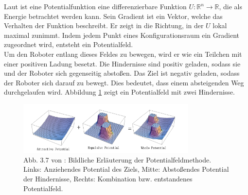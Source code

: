 Laut \cite{Principles:05} ist eine Potentialfunktion eine differenzierbare Funktion $U : \mathbb{R}^{n} \rightarrow \mathbb{R}$, die als Energie betrachtet werden kann. Sein Gradient ist ein Vektor, welche das Verhalten der Funktion beschreibt. Er zeigt in die Richtung, in der $U$ lokal maximal zunimmt. Indem jedem Punkt eines Konfigurationsraum ein Gradient zugeordnet wird, entsteht ein Potentialfeld.\\
Um den Roboter entlang dieses Feldes zu bewegen, wird er wie ein Teilchen mit einer positiven Ladung besetzt. Die Hindernisse sind positiv geladen, sodass sie und der Roboter sich gegenseitig absto{ß}en. Das Ziel ist negativ geladen, sodass der Roboter sich darauf zu bewegt. Dies bedeutet, dass einem absteigenden Weg durchgelaufen wird. Abbildung \ref*{potentialfield01} zeigt ein Potentialfeld mit zwei Hindernisse.
\begin{figure}[H] %
	\centering
	\includegraphics[width=0.8\textwidth]{images/Potential_Field.png}
	\caption{Abb. 3.7 von \cite{Petersen:15}: Bildliche Erläuterung der Potentialfeldmethode. Links: Anziehendes Potential des Ziels, Mitte: Abstoßendes Potential der Hindernisse, Rechts: Kombination bzw. entstandenes Potentialfeld.}
	\label{potentialfield01}
\end{figure}


